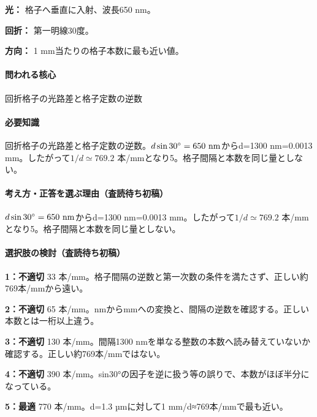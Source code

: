 \noindent\textbf{光：} 格子へ垂直に入射、波長650 nm。\par

\noindent\textbf{回折：} 第一明線30度。\par

\noindent\textbf{方向：} 1 mm当たりの格子本数に最も近い値。\par

\paragraph{問われる核心} 回折格子の光路差と格子定数の逆数

\paragraph{必要知識} 回折格子の光路差と格子定数の逆数。\(d\sin30^\circ=650\ {\rm nm}\)からd=\allowbreak{}1300 nm=\allowbreak{}0.0013 mm。したがって\(1/d\simeq769.2\) 本/mmとなり5。格子間隔と本数を同じ量としない。

\paragraph{考え方・正答を選ぶ理由（査読待ち初稿）} \(d\sin30^\circ=650\ {\rm nm}\)からd=\allowbreak{}1300 nm=\allowbreak{}0.0013 mm。したがって\(1/d\simeq769.2\) 本/mmとなり5。格子間隔と本数を同じ量としない。

\paragraph{選択肢の検討（査読待ち初稿）}\mbox{}\par

\noindent\textbf{1：不適切} 33 本/mm。格子間隔の逆数と第一次数の条件を満たさず、正しい約769本/mmから遠い。\par

\noindent\textbf{2：不適切} 65 本/mm。nmからmmへの変換と、間隔の逆数を確認する。正しい本数とは一桁以上違う。\par

\noindent\textbf{3：不適切} 130 本/mm。間隔1300 nmを単なる整数の本数へ読み替えていないか確認する。正しい約769本/mmではない。\par

\noindent\textbf{4：不適切} 390 本/mm。sin30°の因子を逆に扱う等の誤りで、本数がほぼ半分になっている。\par

\noindent\textbf{5：最適} 770 本/mm。d=\allowbreak{}1.3 µmに対して1 mm/d≈769本/mmで最も近い。\par

